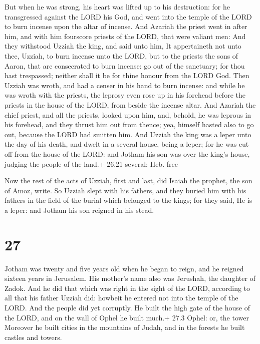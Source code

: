  But when he was strong, his heart was lifted up to his
destruction: for he transgressed against the LORD his God, and went into
the temple of the LORD to burn incense upon the altar of incense.
 And Azariah the priest went in after him, and with him
fourscore priests of the LORD, that were valiant men:  And
they withstood Uzziah the king, and said unto him, It appertaineth not
unto thee, Uzziah, to burn incense unto the LORD, but to the priests the
sons of Aaron, that are consecrated to burn incense: go out of the
sanctuary; for thou hast trespassed; neither shall it be for thine
honour from the LORD God.  Then Uzziah was wroth, and had a
censer in his hand to burn incense: and while he was wroth with the
priests, the leprosy even rose up in his forehead before the priests in
the house of the LORD, from beside the incense altar.  And
Azariah the chief priest, and all the priests, looked upon him, and,
behold, he was leprous in his forehead, and they thrust him out from
thence; yea, himself hasted also to go out, because the LORD had smitten
him.  And Uzziah the king was a leper unto the day of his
death, and dwelt in a several house, being a leper; for he was cut off
from the house of the LORD: and Jotham his son was over the king's
house, judging the people of the land.+ 26.21 several: Heb. free

 Now the rest of the acts of Uzziah, first and last, did
Isaiah the prophet, the son of Amoz, write.  So Uzziah
slept with his fathers, and they buried him with his fathers in the
field of the burial which belonged to the kings; for they said, He is a
leper: and Jotham his son reigned in his stead.

\hypertarget{section-26}{%
\section{27}\label{section-26}}

 Jotham was twenty and five years old when he began to
reign, and he reigned sixteen years in Jerusalem. His mother's name also
was Jerushah, the daughter of Zadok.  And he did that which
was right in the sight of the LORD, according to all that his father
Uzziah did: howbeit he entered not into the temple of the LORD. And the
people did yet corruptly.  He built the high gate of the
house of the LORD, and on the wall of Ophel he built much.+ 27.3 Ophel:
or, the tower  Moreover he built cities in the mountains of
Judah, and in the forests he built castles and towers.

